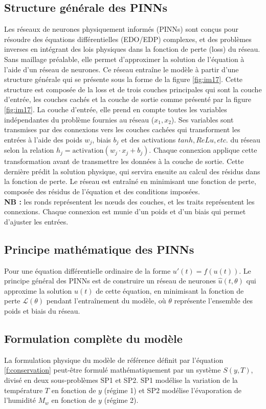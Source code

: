 \documentclass[12pt, oneside]{report} %
\theoremstyle{definition}
\theoremstyle{remark}
\begin{document}
		\subsection{Structure générale des PINNs}
Les réseaux de neurones physiquement informés (PINNs) sont conçus pour résoudre des équations différentielles (EDO/EDP) complexes, et des problèmes inverses en intégrant des lois physiques dans la fonction de perte (loss) du réseau. Sans maillage préalable, elle permet d'approximer la solution de l'équation à l'aide d'un réseau de neurones. Ce réseau entraîne le modèle à partir d'une structure générale qui se présente sous la forme de la figure \eqref{fig:im17}. Cette structure est composée de la loss et de trois couches principales qui sont la couche d'entrée, les couches cachés et la couche de sortie comme présenté par la figure \eqref{fig:im17}. La couche d'entrée, elle prend en compte toutes les variables indépendantes du problème fournies au réseau ($x_1, x_2$). Ses variables sont transmises par des connexions vers les couches cachées qui transforment les entrées à l'aide des poids $w_j$, biais $b_j$ et des activations $tanh, ReLu, etc. $ du réseau selon la relation $h_j = \text{activation} (w_j\cdot x_j + b_j)$. Chaque connexion applique cette transformation avant de transmettre les données à la couche de sortie.  
Cette dernière prédit la solution physique, qui servira ensuite au calcul des résidus dans la fonction de perte.  
Le réseau est entraîné en minimisant une fonction de perte, composée des résidus de l’équation et des conditions imposées.
 \\	 
\textbf{NB : } les ronds représentent les nœuds des couches, et les traits représentent les connexions. Chaque connexion est munie d'un poids et d'un biais qui permet d'ajuster les entrées.

		\subsection{Principe mathématique des PINNs}
	
	Pour une équation différentielle ordinaire de la forme $u'(t) = f(u(t))$. Le principe général des PINNs est de construire un réseau de neurones $\hat{u}(t, \theta)$ qui approxime la solution $u(t)$ de cette équation, en minimisant la fonction de perte $\mathcal{L}(\theta)$ pendant l'entraînement du modèle, où $\theta$ représente l'ensemble des poids et biais du réseau.
	
	\subsection{Formulation complète du modèle}
	La formulation physique du modèle de référence définit par l'équation \eqref{f:conservation} peut-être formulé mathématiquement par un système $S(y, T)$, divisé en deux sous-problèmes SP1 et SP2. SP1 modélise la variation de la température $T$ en fonction de $y$ (régime 1) et SP2 modélise l'évaporation de l'humidité $M_w$ en fonction de $y$ (régime 2).
\end{document}

